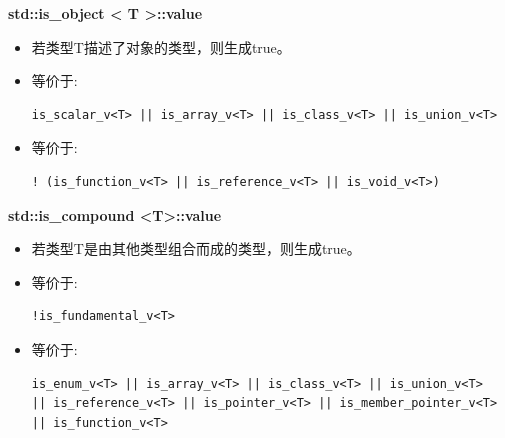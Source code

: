 \textbf{std::is\_object < T >::value}

\begin{itemize}
\item 
若类型T描述了对象的类型，则生成true。

\item 
等价于: 
\begin{lstlisting}[style=styleCXX]
is_scalar_v<T> || is_array_v<T> || is_class_v<T> || is_union_v<T>
\end{lstlisting}

\item
等价于: 
\begin{lstlisting}[style=styleCXX]
! (is_function_v<T> || is_reference_v<T> || is_void_v<T>)
\end{lstlisting}
\end{itemize}

\textbf{std::is\_compound <T>::value}

\begin{itemize}
\item 
若类型T是由其他类型组合而成的类型，则生成true。

\item 
等价于: 
\begin{lstlisting}[style=styleCXX]
!is_fundamental_v<T>
\end{lstlisting}

\item
等价于: 
\begin{lstlisting}[style=styleCXX]
is_enum_v<T> || is_array_v<T> || is_class_v<T> || is_union_v<T>
|| is_reference_v<T> || is_pointer_v<T> || is_member_pointer_v<T>
|| is_function_v<T>
\end{lstlisting}
\end{itemize}




